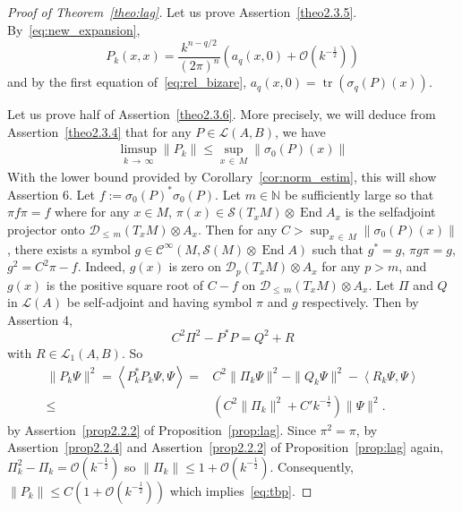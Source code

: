 \documentclass[10pt,a4paper]{article}
\theoremstyle{definition}
\numberwithin{equation}{section}
\newcommand{\N}{{\mathbb{N}}}
\newcommand{\si}{{\sigma}}
\newcommand{\op}{\operatorname}
\newcommand{\Ci}{{\mathcal{C}}^{\infty}}
\newcommand{\bigo}{\mathcal{O}}
\newcommand{\D}{\mathcal{D}}
\newcommand{\symb}{\mathcal{S}}
\newcommand{\lag}{\mathcal{L}}
\begin{document}
\begin{proof}[Proof of Theorem~\ref{theo:lag}]
Let us prove Assertion~\eqref{theo2.3.5}. By~\eqref{eq:new_expansion},
\[
P_k(x,x) = \frac{k^{n-q/2}}{ (2\pi)^n} \left(a_q(x,0) + \bigo \left(
k^{-\frac{1}{2}}\right) \right)
\]
and by the first equation of~\eqref{eq:rel_bizare}, $a_q(x,0) = \op{tr} (\si_q(P) (x))$.

 Let us prove half of Assertion~\eqref{theo2.3.6}. More precisely, we will deduce from Assertion~\eqref{theo2.3.4} that for any $P \in \lag (A,B)$, we have
\begin{gather}\label{eq:tbp}
\limsup_{k\,\rightarrow\,\infty} \| P_k \| \leqslant \sup_{x\,\in\,M} \|
\si_0 (P)(x) \|
\end{gather}
With the lower bound provided by Corollary~\ref{cor:norm_estim}, this will show Assertion 6. Let $f := \si_0(P)^* \si_0 (P)$. Let $m \in \N$ be sufficiently large so that $\pi f \pi = f $ where for any $x \in M$, $\pi (x)
\in \symb (T_xM)
\otimes \op{End} A_x $ is the selfadjoint projector onto $\D_{\leqslant\,m } (T_xM) \otimes A_x$. Then for any $C > \sup_{x\,\in\,M} \|
\si_0 (P)(x) \|$, there exists a symbol $g \in \Ci (M, \symb (M) \otimes
\op{End} A)$ such that $g ^* = g$, $\pi g \pi = g $, $g^2 = C^2 \pi - f$. Indeed, $g(x)$ is zero on $\D_p (T_xM) \otimes A_x$ for any $ p > m$, and $g(x) $ is the positive square root of $C - f$ on $\D_{\leqslant\,m} (T_xM) \otimes A_x$. Let $\Pi$ and $Q$ in $\lag (A)$ be self-adjoint and having symbol $\pi$ and $g$ respectively. Then by Assertion 4,
\[
C^2 \Pi^2 - P^* P = Q^2 + R
\]
with $R \in \lag_1 (A,B)$. So
\begin{align*}
\| P_k \Psi \| ^2 = \left\langle P_k^* P_k \Psi, \Psi \right\rangle = & C^2 \| \Pi_k
\Psi \|^2 - \| Q_k \Psi \|^2 - \left\langle R_k \Psi, \Psi \right\rangle \\
\leqslant & \left(C^2 \| \Pi_k \|^2 + C' k^{-\frac{1}{2}}\right) \| \Psi \|^2.
\end{align*}
by Assertion~\eqref{prop2.2.2} of Proposition~\ref{prop:lag}. Since $\pi^2 = \pi$, by Assertion~\eqref{prop2.2.4} and Assertion~\eqref{prop2.2.2} of Proposition~\ref{prop:lag} again, $\Pi_k^2 -
\Pi_k = \bigo (k^{-\frac{1}{2}})$ so $\| \Pi_k \| \leqslant 1 + \bigo (k^{-\frac{1}{2}})$. Consequently, $\| P_k \| \leqslant C (1 + \bigo (k^{-\frac{1}{2}}))$ which implies~\eqref{eq:tbp}.





\end{proof}
\end{document}
